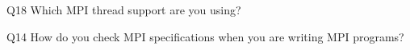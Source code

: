 \begin{description}%
\item{Q18} Which MPI thread support are you using?%
\item{Q14} How do you check MPI specifications when you are writing MPI programs?%
\end{description}%
